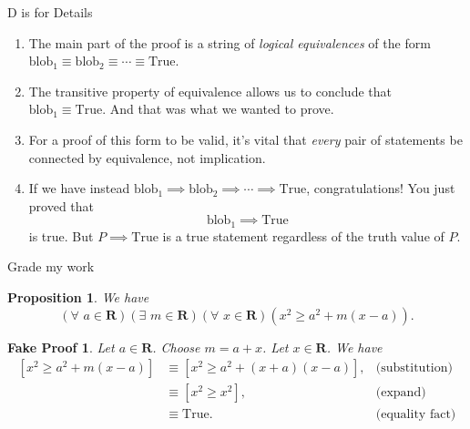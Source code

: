\documentclass[usenames,dvipsnames,fleqn,leqno,10pt, pdflatex]{beamer}
\newcommand{\reals}{\mathbf{R}}
\newenvironment{PenList}{
  \begin{enumerate}[\textcolor{UNK-blue}{\PencilRightDown}]
    \addtolength{\itemsep}{-0.0\itemsep}}
  {\end{enumerate}}
\newtheorem{myprop}{Proposition}
\newtheorem{fakeproof}{Fake Proof}
\begin{document}
\begin{frame}{D is for Details}

\begin{PenList}
\item The main part of the proof is  a string of \emph{logical equivalences} of the 
form $\mbox{blob}_1 \equiv \mbox{blob}_2 \equiv \cdots 
\equiv \mbox{True}$.

\item The transitive property  of equivalence allows us to conclude that $\mbox{blob}_1 \equiv \mbox{True}$. And that was what we wanted to prove.

\item For a proof of this form to be valid, it's vital that \emph{every} pair of statements be connected by equivalence, not implication. 

\item If we have instead $\mbox{blob}_1 \implies \mbox{blob}_2 \implies  \cdots \implies \mbox{True}$, congratulations! You just proved that
\begin{equation*}
   \mbox{blob}_1   \implies  \mbox{True}
\end{equation*}
is true.  But $ P \implies \mbox{True}$ is a true statement regardless of the truth value of $P$.  


\end{PenList}
\end{frame}
\begin{frame}{Grade my work}

\begin{myprop} We have
$$
\left(\forall \,\, a \in \reals\right)\left(\exists \,\, m \in \reals\right)\left (\forall \,\, x \in \reals \right) \left(x^2 \geq a^2 + m (x-a) \right).
$$
\end{myprop}

\begin{fakeproof}Let $a \in \reals$. Choose $m = a+x$. Let $x \in \reals$. We have
\begin{align*}
    \left[x^2 \geq a^2 + m (x -a) \right] &\equiv \left[x^2 \geq a^2 + (x+a)  (x -a) \right],
       &\mbox{(substitution)}\\
       &\equiv \left[x^2 \geq x^2 \right], &\mbox{(expand)}\\
       &\equiv \mbox{True}.   &\mbox{(equality fact)}\\
\end{align*}
\end{fakeproof}

\end{frame}
\end{document}
